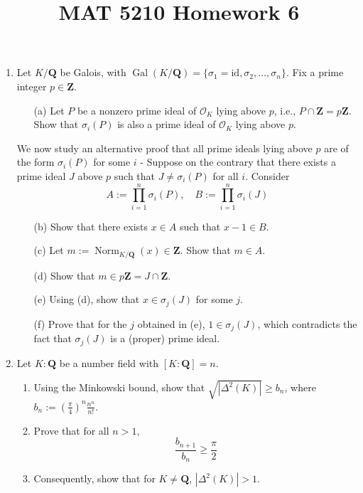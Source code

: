 \documentclass{article}
\title{MAT 5210 Homework 6}
\author{}
\date{}
\begin{document}
\maketitle

\begin{enumerate}
    \item Let $K / \mathbf{Q}$ be Galois, with $\operatorname{Gal}(K / \mathbf{Q}) = \{\sigma_1 = \text{id}, \sigma_2, \ldots, \sigma_n\}$. Fix a prime integer $p \in \mathbf{Z}$.
    \begin{enumerate}
        \item[(a)] Let $P$ be a nonzero prime ideal of $\mathcal{O}_K$ lying above $p$, i.e., $P \cap \mathbf{Z} = p\mathbf{Z}$. Show that $\sigma_i(P)$ is also a prime ideal of $\mathcal{O}_K$ lying above $p$.
    \end{enumerate}

    We now study an alternative proof that all prime ideals lying above $p$ are of the form $\sigma_i(P)$ for some $i$ - Suppose on the contrary that there exists a prime ideal $J$ above $p$ such that $J \neq \sigma_i(P)$ for all $i$. Consider
    \[
    A := \prod_{i=1}^{n} \sigma_i(P), \quad B := \prod_{i=1}^{n} \sigma_i(J)
    \]
    \begin{enumerate}
        \item[(b)] Show that there exists $x \in A$ such that $x - 1 \in B$.
        \item[(c)] Let $m := \operatorname{Norm}_{K / \mathbf{Q}}(x) \in  \mathbf{Z}$. Show that $m \in A$. %
        \item[(d)] Show that $m \in p\mathbf{Z} = J \cap \mathbf{Z}$.
        \item[(e)] Using (d), show that $x \in \sigma_j(J)$ for some $j$.
        \item[(f)] Prove that for the $j$ obtained in (e), $1 \in \sigma_j(J)$, which contradicts the fact that $\sigma_j(J)$ is a (proper) prime ideal.
    \end{enumerate}

    \item Let $K : \mathbf{Q}$ be a number field with $[K : \mathbf{Q}] = n$.
    \begin{enumerate}
        \item Using the Minkowski bound, show that $\sqrt{|\Delta^2(K)|} \geq b_n$, where $b_n := \left(\frac{\pi}{4}\right)^n \frac{n^n}{n!}$.
        \item Prove that for all $n > 1$,
        \[
        \frac{b_{n+1}}{b_n} \geq \frac{\pi}{2}
        \]
        \item Consequently, show that for $K \neq \mathbf{Q}$, $|\Delta^2(K)| > 1$.
    \end{enumerate}


\end{enumerate}
\end{document}

